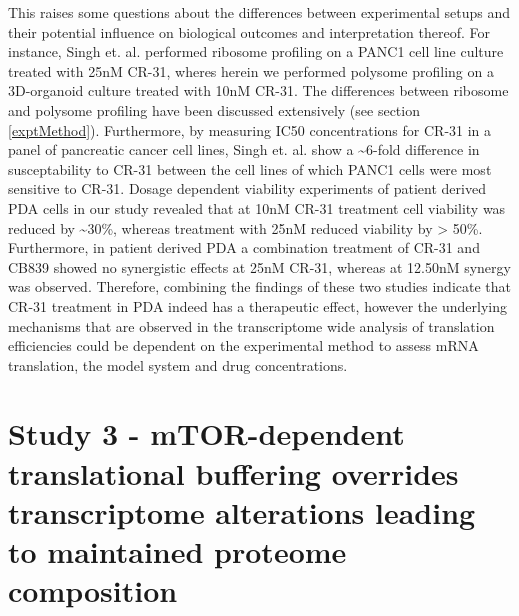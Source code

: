 \documentclass[12pt,openany]{book}
\begin{document}
This raises some questions about the differences between experimental
setups and their potential influence on biological outcomes and
interpretation thereof. For instance, Singh et. al. performed ribosome
profiling on a PANC1 cell line culture treated with 25nM CR-31, wheres
herein we performed polysome profiling on a 3D-organoid culture treated
with 10nM CR-31. The differences between ribosome and polysome profiling
have been discussed extensively (see section \ref{exptMethod}).
Furthermore, by measuring IC50 concentrations for CR-31 in a panel of
pancreatic cancer cell lines, Singh et. al. show a
\textasciitilde{}6-fold difference in susceptability to CR-31 between
the cell lines of which PANC1 cells were most sensitive to CR-31. Dosage
dependent viability experiments of patient derived PDA cells in our
study revealed that at 10nM CR-31 treatment cell viability was reduced
by \textasciitilde{}30\%, whereas treatment with 25nM reduced viability
by \textgreater{} 50\%. Furthermore, in patient derived PDA a
combination treatment of CR-31 and CB839 showed no synergistic effects
at 25nM CR-31, whereas at 12.50nM synergy was observed. Therefore,
combining the findings of these two studies indicate that CR-31
treatment in PDA indeed has a therapeutic effect, however the underlying
mechanisms that are observed in the transcriptome wide analysis of
translation efficiencies could be dependent on the experimental method
to assess mRNA translation, the model system and drug concentrations.
\newline
\section{Study 3 - mTOR-dependent translational buffering overrides transcriptome alterations leading to
maintained proteome composition}
\end{document}
